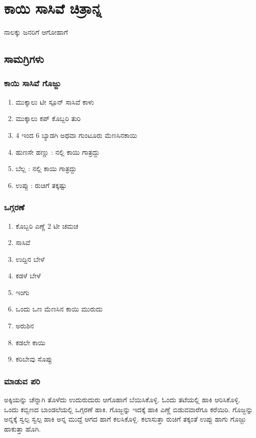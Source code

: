 \documentclass[recipes.tex]{subfiles}
\begin{document}
\section{ಕಾಯಿ ಸಾಸಿವೆ ಚಿತ್ರಾನ್ನ}
{\small ನಾಲಕ್ಕು ಜನರಿಗೆ ಆಗೋಹಾಗೆ }
\subsection{ಸಾಮಗ್ರಿಗಳು}
\subsubsection{ಕಾಯಿ ಸಾಸಿವೆ ಗೊಜ್ಜು}
{
    \small 
\begin{enumerate}

    \item ಮುಕ್ಕಾಲು ಟೀ ಸ್ಪೂನ್ ಸಾಸಿವೆ ಕಾಳು 
    \item ಮುಕ್ಕಾಲು ಕಪ್ ಕೊಬ್ಬರಿ ತುರಿ 
    \item 4 ಇಂದ 6 ಬ್ಯಾಡಗಿ ಅಥವಾ ಗುಂಟೂರು ಮೆಣಸಿನಕಾಯಿ  
    \item ಹುಣಸೇ ಹಣ್ಣು : ನಲ್ಲಿ ಕಾಯಿ ಗಾತ್ರದ್ದು  
    \item ಬೆಲ್ಲ : ನಲ್ಲಿ ಕಾಯಿ ಗಾತ್ರದ್ದು  
    \item ಉಪ್ಪು : ರುಚಿಗೆ ತಕ್ಕಷ್ಟು
\end{enumerate}
\subsubsection{ಒಗ್ಗರಣೆ}
\begin{enumerate}
    \item ಕೊಬ್ಬರಿ ಎಣ್ಣೆ 2 ಟೀ ಚಮಚ
    \item ಸಾಸಿವೆ 
    \item ಉದ್ದಿನ ಬೇಳೆ
    \item ಕಡಳೆ  ಬೇಳೆ 
    \item ಇಂಗು
    \item ಒಂದು ಒಣ ಮೆಣಸಿನ ಕಾಯಿ ಮುರುದು
    \item ಅರುಶಿನ
    \item ಕಡಲೇ  ಕಾಯಿ 
    \item ಕರಿಬೇವು ಸೊಪ್ಪು 
\end{enumerate}
\subsubsection{ಮಾಡುವ ಪರಿ}
ಅಕ್ಕಿಯನ್ನು ಚೆನ್ನಾಗಿ ತೊಳೆದು ಉದುರುದುರು ಆಗೊಹಾಗೆ ಬೆಯಿಸಿಕೊಳ್ಳಿ. ಓಂದು ತಟೆಯಲ್ಲಿ ಹಾಕಿ ಆರಿಸಿಕೊಳ್ಳಿ.
ಒಂದು ಕಬ್ಬಿಣದ ಬಾಂಡಲೆಯಲ್ಲಿ ಒಗ್ಗರಣೆ ಹಾಕಿ. ಗೊಜ್ಜನ್ನು ಇದಕ್ಕೆ ಹಾಕಿ ಎಣ್ಣೆ ಬಿಡುವವಾರೆಗೂ ಕರೆಯಿರಿ.
ಗೊಜ್ಜನ್ನು ಅನ್ನಕ್ಕೆ ಸ್ವಲ್ಪ ಸ್ವಲ್ಪ ಹಾಕಿ ಅನ್ನ ಮುದ್ದೆ ಆಗದ ಹಾಗೆ ಕಲಸಿಕೊಳ್ಲಿ. ಕಲಾಸುತ್ತಾ ರುಚಿಗೆ ತಕ್ಕಂತೆ ಉಪ್ಪು ಹಾಗು 
ಗೊಜ್ಜು ಹಾಕುತ್ತಾ ಹೊಗಿ.
}
\end{document}
